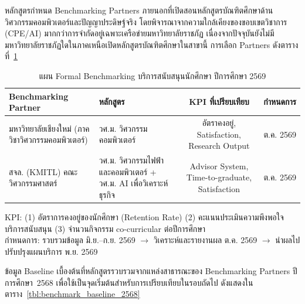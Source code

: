 หลักสูตรกำหนด Benchmarking Partners ภายนอกที่เปิดสอนหลักสูตรบัณฑิตศึกษาด้านวิศวกรรมคอมพิวเตอร์และปัญญาประดิษฐ์จริง โดยพิจารณาจากความใกล้เคียงของขอบเขตวิชาการ (CPE/AI) มากกว่าการจำกัดอยู่เฉพาะเครือข่ายมหาวิทยาลัยราชภัฏ เนื่องจากปัจจุบันยังไม่มีมหาวิทยาลัยราชภัฏใดในภาคเหนือเปิดหลักสูตรบัณฑิตศึกษาในสาขานี้ การเลือก Partners ดังตารางที่~\ref{tbl:benchmarking_plan}

\begin{table}[H]
  \centering
  \caption{แผน Formal Benchmarking บริการสนับสนุนนักศึกษา ปีการศึกษา 2569}
  \label{tbl:benchmarking_plan}
  \begingroup
  \footnotesize
  \setlength{\tabcolsep}{3pt}
  \renewcommand{\arraystretch}{1.2}
  \begin{tabularx}{\linewidth}{|>{\raggedright\arraybackslash}X|>{\raggedright\arraybackslash}X|c|c|}
    \hline
    \textbf{Benchmarking Partner} & \textbf{หลักสูตร} & \textbf{KPI ที่เปรียบเทียบ} & \textbf{กำหนดการ} \\
    \hline
    มหาวิทยาลัยเชียงใหม่ (ภาควิชาวิศวกรรมคอมพิวเตอร์) & วศ.ม. วิศวกรรมคอมพิวเตอร์ & อัตราคงอยู่, Satisfaction, Research Output & ต.ค. 2569 \\
    \hline
    สจล. (KMITL) คณะวิศวกรรมศาสตร์ & วศ.ม. วิศวกรรมไฟฟ้าและคอมพิวเตอร์ + วศ.ม. AI เพื่อวิเคราะห์ธุรกิจ & Advisor System, Time-to-graduate, Satisfaction & ต.ค. 2569 \\
    \hline
  \end{tabularx}
  \endgroup
  \begin{flushleft}
    \footnotesize KPI: (1) อัตราการคงอยู่ของนักศึกษา (Retention Rate) (2) คะแนนประเมินความพึงพอใจบริการสนับสนุน (3) จำนวนกิจกรรม co-curricular ต่อปีการศึกษา \\
    กำหนดการ: รวบรวมข้อมูล มิ.ย.--ก.ย. 2569 $\rightarrow$ วิเคราะห์และรายงานผล ต.ค. 2569 $\rightarrow$ นำผลไปปรับปรุงแผนบริการ พ.ย. 2569
  \end{flushleft}
\end{table}

ข้อมูล Baseline เบื้องต้นที่หลักสูตรรวบรวมจากแหล่งสาธารณะของ Benchmarking Partners ปีการศึกษา~2568 เพื่อใช้เป็นจุดเริ่มต้นสำหรับการเปรียบเทียบในรอบถัดไป ดังแสดงในตาราง~\ref{tbl:benchmark_baseline_2568}

